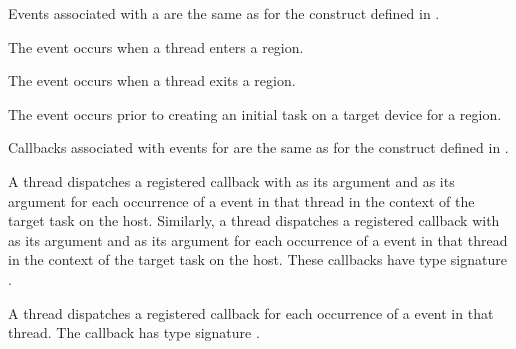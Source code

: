 \events

Events associated with a  are the same as for the  
construct defined in .

The  event occurs when a thread enters a  region.

The  event occurs when a thread exits a  region.

The  event occurs prior to creating an initial task on 
a target device for a  region.

\tools

Callbacks associated with events for  are the same as
for the  construct defined in .

A thread dispatches a registered  callback with 
 as its  argument and  as 
its  argument for each occurrence of a  event in that 
thread in the context of the target task on the host. Similarly, a thread dispatches 
a registered  callback with  as its 
 argument and  as its  argument for each 
occurrence of a  event in that thread in the context of the target 
task on the host. These callbacks have type signature . 

A thread dispatches a registered  callback for 
each occurrence of a  event in that thread. The callback has 
type signature .

